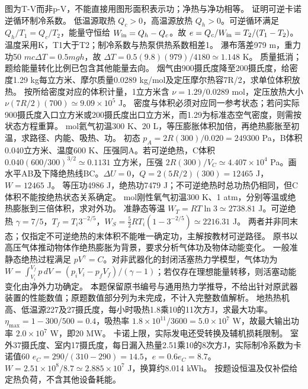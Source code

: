 \crosscheck 图为T-V而非p-V，不能直接用图形面积表示功；净热与净功相等。
\problemtext 证明可逆卡诺逆循环制冷系数。
\workings 低温源取热 $Q_c>0$，高温源放热 $Q_h>0$。可逆循环满足 $Q_h/T_1=Q_c/T_2$，能量守恒给 $W_{\rm in}=Q_h-Q_c$。故 $e=Q_c/W_{\rm in}=T_2/(T_1-T_2)$。
\crosscheck 温度采用K，T1大于T2；制冷系数与热泵供热系数相差1。
\problemtext 瀑布落差979 m，重力功50%
\workings $mc\Delta T=0.5mgh$，故 $\Delta T=0.5(9.8)(979)/4180\simeq1.148$ K。
\crosscheck 质量抵消；题给能量转化比例已包含其他能量去向。
\problemtext 烟气由900摄氏度降至200摄氏度，给密度1.29 kg每立方米、摩尔质量0.0289 kg/mol及定压摩尔热容7R/2，求单位体积放热。
\workings 按所给密度对应的体积计量，1立方米含 $\nu=1.29/0.0289$ mol，定压放热大小 $\nu(7R/2)(700)\simeq9.09\times10^5$ J。
\crosscheck 密度与体积必须对应同一参考状态；若问实际900摄氏度入口立方米或200摄氏度出口立方米，而1.29为标准态空气密度，则需按状态方程重算。
 mol氦气初温300 K、20 L，等压膨胀体积加倍，再绝热膨胀至初温，求路径、内能、吸热、功。
\workings 初态 $p_A=2R(300)/0.020=249300$ Pa，B体积0.040立方米、温度600 K、压强同A。若可逆绝热，C体积 $0.040(600/300)^{3/2}\simeq0.1131$ 立方米，压强 $2R(300)/V_C\simeq4.407\times10^4$ Pa。画水平AB及下降绝热线BC。$\Delta U=0$，$Q=2(5R/2)(300)=12465$ J，$W=12465$ J。
\crosscheck 等压功4986 J，绝热功7479 J；不可逆绝热时总功热仍相同，但C体积不能按绝热状态关系确定。
 mol刚性氧气初温300 K、1 atm，分别等温或绝热膨胀到三倍体积，求对外功。
\workings 准静态等温 $W_T=RT\ln3\simeq2738.81$ J。可逆绝热 $\gamma=7/5$，$T_f=T_i3^{-2/5}$，$W_S=\frac52RT_i(1-3^{-2/5})\simeq2216.31$ J。
\crosscheck 两者并非同末态；仅指定不可逆绝热的末体积不能唯一确定功，主解按教材可逆路径。
\problemtext 原书以高压气体推动物体作绝热膨胀为背景，要求分析气体功及物体动能变化。
\workings 一般准静态绝热过程满足 $pV^\gamma=C$。对非武器化的封闭活塞热力学模型，气体功为 $W=\int_{V_i}^{V_f}p\,dV=(p_iV_i-p_fV_f)/(\gamma-1)$；若仅存在理想能量转移，则活塞动能变化由净外力功确定。
\crosscheck 本题保留原书编号与通用热力学推导，不给出针对原武器装置的性能数值；原题数值部分列为未完成，不计入完整数值解析。
\problemtext 地热热机高、低温源227及27摄氏度，每小时吸热1.8乘10的11次方J，求最大功率。
\workings $\eta_{\max}=1-300/500=0.4$，吸热率 $1.8\times10^{11}/3600=5.0\times10^7$ W，故最大输出功率 $2.0\times10^7$ W，即20 MW。
\crosscheck 卡诺上限，实际发电还受转换及辅机损耗限制。
\problemtext 室外37摄氏度、室内17摄氏度，每日漏入热量2.51乘10的8次方J，实际制冷系数为卡诺值60%
\workings $e_C=290/(310-290)=14.5$，$e=0.6e_C=8.7$。$W=2.51\times10^8/8.7\simeq2.885\times10^7$ J，换算约8.014 kWh。
\crosscheck 按题设恒温及仅补偿给定热负荷，不含其他设备耗能。
